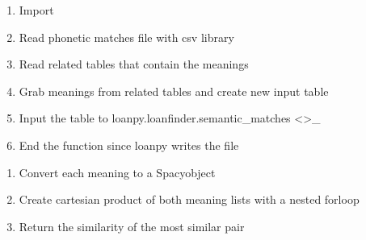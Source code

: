 \documentclass[letterpaper,10pt,english]{sphinxmanual}
\begin{document}
\begin{fulllineitems}
\label{\detokenize{workflow:gothuncommands.semmatch.main}}
\pysigstartsignatures
{}
\pysigstopsignatures\begin{enumerate}
%
\item {} 
\sphinxAtStartPar
Import 

\item {} 
\sphinxAtStartPar
Read phonetic matches file with csv library

\item {} 
\sphinxAtStartPar
Read related tables that contain the meanings

\item {} 
\sphinxAtStartPar
Grab meanings from related tables and create new input table

\item {} 
\sphinxAtStartPar
Input the table to loanpy.loanfinder.semantic\_matches
\textless{}\textgreater{}\textasciigrave{}\_

\item {} 
\sphinxAtStartPar
End the function since loanpy writes the file

\end{enumerate}

\end{fulllineitems}


\begin{fulllineitems}
\label{\detokenize{workflow:gothuncommands.semmatch.semsim}}
\pysigstartsignatures
{}
\pysigstopsignatures\begin{enumerate}
%
\item {} 
\sphinxAtStartPar
Convert each meaning to a Spacy\sphinxhyphen{}object

\item {} 
\sphinxAtStartPar
Create cartesian product of both meaning lists with a
nested for\sphinxhyphen{}loop

\item {} 
\sphinxAtStartPar
Return the similarity of the most similar pair

\end{enumerate}

\end{fulllineitems}
\end{document}
